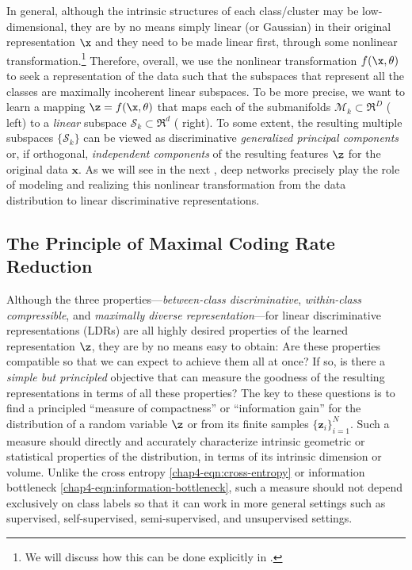 \documentclass[../../book-main.tex]{subfiles}
\begin{document}
In general, although the intrinsic structures of each class/cluster may be low-dimensional, they are by no means simply linear (or Gaussian) in their original representation $\x$ and they need to be made linear first, through some nonlinear transformation.\footnote{We will discuss how this can be done explicitly in .} Therefore, overall, we use the nonlinear transformation $f(\x,\theta)$ to seek a representation of the data such that the subspaces that represent all the classes are maximally incoherent linear subspaces. To be more precise, we want to learn a mapping {$\z = f(\x,\theta)$} that maps each of the submanifolds $\mathcal{M}_k \subset \Re^D$ ( left) to a {\em linear} subspace $\mathcal{S}_k \subset \Re^d$ ( right). To some extent, the resulting multiple subspaces $\{\mathcal{S}_k\}$ can be viewed as discriminative {\em generalized principal components} \cite{GPCA} or, if orthogonal, {\em independent components} \cite{hyvarinen2000independent} of the resulting features $\z$ for the original data $\bm x$.
As we will see in the next , deep networks precisely play the role of modeling and realizing this nonlinear transformation from the data distribution to linear discriminative representations.


\subsection{The Principle of Maximal Coding Rate Reduction}\label{subsec:MCR2}





Although the three properties---{\em between-class discriminative}, {\em
within-class compressible}, and {\em maximally diverse representation}---for linear discriminative representations (LDRs) are all highly desired properties  of the learned representation $\z$, they are by no means easy to obtain: Are these properties compatible so that we can expect to achieve them all at once? If so, is there a {\em simple but principled} objective that can measure the goodness of the resulting representations in terms of all these properties? The key to these questions {is to find} a principled ``measure of compactness'' or ``information gain''  for the distribution of a random variable $\z$ or from its finite samples $\{\bm z_i\}_{i=1}^N$. Such a measure should directly and accurately characterize intrinsic geometric or statistical properties of the distribution, in terms of its intrinsic dimension or {volume}. Unlike the cross entropy \eqref{chap4-eqn:cross-entropy} or information bottleneck \eqref{chap4-eqn:information-bottleneck}, such a measure should not depend exclusively on class labels so that it can work in more general settings such as supervised, self-supervised, semi-supervised, and unsupervised settings.
\end{document}
